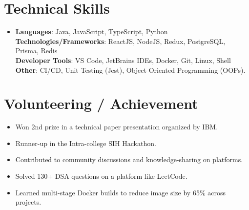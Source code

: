 \documentclass[letterpaper,11pt]{article}
\newcommand{\resumeItem}[1]{
  \item\small{
    {#1 \vspace{-2pt}}
  }
}
\newcommand{\resumeItemListStart}{\begin{itemize}}
\newcommand{\resumeItemListEnd}{\end{itemize}\vspace{-5pt}}
\begin{document}
%
\section{Technical Skills}
 \vspace{5pt}
 \begin{itemize}[leftmargin=0.15in, label={}]
    \item{
     \textbf{Languages}{: Java, JavaScript, TypeScript, Python} \\
     \vspace{4pt}
     \textbf{Technologies/Frameworks}{: ReactJS, NodeJS, Redux, PostgreSQL, Prisma, Redis} \\
     \vspace{4pt}
     \textbf{Developer Tools}{: VS Code, JetBrains IDEs, Docker, Git, Linux, Shell} \\
     \vspace{4pt}
     \textbf{Other}{: CI/CD, Unit Testing (Jest), Object Oriented Programming (OOPs).} \\
    }
 \end{itemize}
 \vspace{-10pt}



\section{Volunteering / Achievement}
 \vspace{5pt}
    \resumeItemListStart
        \resumeItem{Won 2nd prize in a technical paper presentation organized by IBM.}
        \resumeItem{Runner-up in the Intra-college SIH Hackathon.}
        \resumeItem{Contributed to community discussions and knowledge-sharing on platforms.}
        \resumeItem{Solved 130+ DSA questions on a platform like LeetCode.}
        \resumeItem{Learned multi-stage Docker builds to reduce image size by 65\% across projects.}
    \resumeItemListEnd
\end{document}
